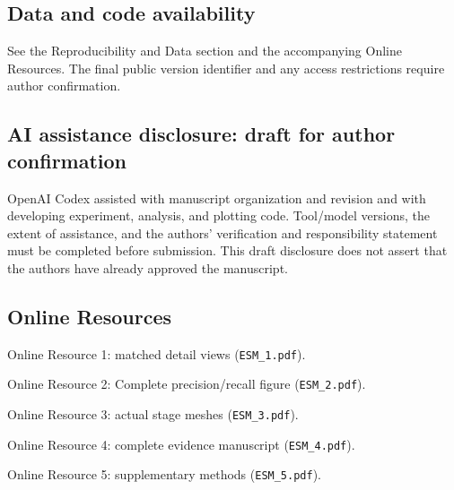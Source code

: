 \documentclass[11pt,a4paper]{article}
\begin{document}
\subsection*{Data and code availability}
See the Reproducibility and Data section and the accompanying Online Resources.
The final public version identifier and any access restrictions require author confirmation.
\subsection*{AI assistance disclosure: draft for author confirmation}
OpenAI Codex assisted with manuscript organization and revision and with developing
experiment, analysis, and plotting code. Tool/model versions, the extent of assistance,
and the authors' verification and responsibility statement must be completed before submission.
This draft disclosure does not assert that the authors have already approved the manuscript.

\subsection*{Online Resources}
Online Resource 1: matched detail views (\texttt{ESM\_1.pdf}).

Online Resource 2: Complete precision/recall figure (\texttt{ESM\_2.pdf}).

Online Resource 3: actual stage meshes (\texttt{ESM\_3.pdf}).

Online Resource 4: complete evidence manuscript (\texttt{ESM\_4.pdf}).

Online Resource 5: supplementary methods (\texttt{ESM\_5.pdf}).
\end{document}
